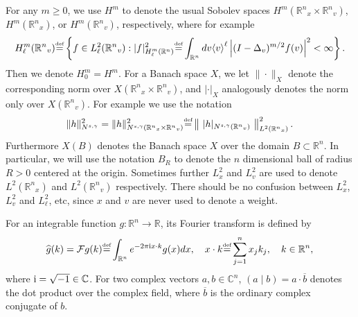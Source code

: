 \documentclass{amsart}
\numberwithin{equation}{section}
\begin{document}
 For any $m\geq 0$, we use $H^m$ to denote the
usual Sobolev spaces $H^m({{\mathbb R}^{n}}_x\times{{\mathbb R}^{n}}_{v})$, $H^m({{\mathbb R}^{n}}_x)$, or  $H^m({{\mathbb R}^{n}}_{v})$, respectively, where for example
$$
H^m_{\ell}({{\mathbb R}^{n}}_{v})
{\overset{\mbox{\tiny{def}}}{=}}
\left\{ f \in L^2_\ell ({{\mathbb R}^{n}}_{v}) : {|} f {|}_{H^m_{\ell}({{\mathbb R}^{n}})}^2 
{\overset{\mbox{\tiny{def}}}{=}} \int_{{\mathbb R}^{n}} dv { \left< {{v}} \right> }^\ell \left| (I - \Delta_v)^{m/2} f(v) \right|^2 <\infty
\right\}.
$$
Then we denote $H^m_{0} = H^m$.
For a Banach space $X$,
we let $\|\cdot\|_{X}$ denote the corresponding norm over $X({{\mathbb R}^{n}}_x\times{{\mathbb R}^{n}}_{v})$, 
and 
${|}\cdot{|}_{X}$ analogously denotes the norm only over $X({{\mathbb R}^{n}}_{v})$.  For example we use the notation
$$
\| h\|_{N^{s,\gamma}}^2
=
\| h\|_{{N^{s,\gamma}}({{\mathbb R}^{n}}_x\times{{\mathbb R}^{n}}_{v})}^2
{\overset{\mbox{\tiny{def}}}{=}}
\left\|~ {|} h{|}_{{N^{s,\gamma}}({{\mathbb R}^{n}}_{v})} ~ \right\|_{L^2({{\mathbb R}^{n}}_x)}^2.
$$
Furthermore $X(B)$ denotes the Banach space $X$ over the domain $B\subset {{\mathbb R}^{n}}$.  In particular, we will use the notation $B_R$ to denote the ${n}$ dimensional ball of radius $R>0$ centered at the origin.  
Sometimes further $L^2_x$ and $L^2_{v}$ are
used to denote $L^2({{\mathbb R}^{n}}_x)$ and $L^2({{\mathbb R}^{n}}_{v})$
respectively.  There should be no confusion between $L^2_x$, $L^2_{v}$ and $L^2_\ell$, etc, since $x$ and ${v}$ are never used to denote a weight.  

For an integrable function $g: {{\mathbb R}^{n}}\to{\mathbb{R}}$, its Fourier transform is defined by
\begin{equation*}
  \widehat{g}(k)= {\mathcal{F}} g(k){\overset{\mbox{\tiny{def}}}{=}} \int_{{\mathbb R}^{n}} e^{-2\pi {{\rm i}} x\cdot k} g(x)dx, \quad
  x\cdot
   k{\overset{\mbox{\tiny{def}}}{=}}\sum_{j=1}^{n} x_jk_j,
   \quad
   k\in{{\mathbb R}^{n}},
\end{equation*}
where ${{\rm i}} =\sqrt{-1}\in \mathbb{C}$. For two
complex vectors $a,b\in\mathbb{C}^{n}$, $(a\mid b)=a\cdot
\overline{b}$ denotes the dot product over the complex field, where
$\overline{b}$ is the ordinary complex conjugate of $b$. 
\end{document}
